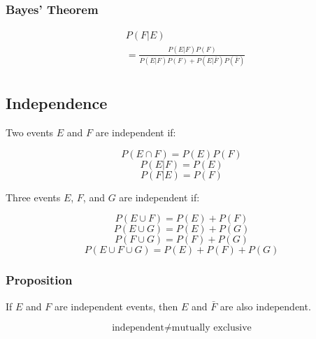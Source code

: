\subsubsection*{Bayes' Theorem}

\begin{align*}
       & P(F|E)                                                   \\
       & = \frac{P(E|F)P(F)}{P(E|F)P(F) + P(E|\bar{F})P(\bar{F})} \\
\end{align*}

\subsection*{Independence}

Two events $E$ and $F$ are independent if:

$$ P(E \cap F) = P(E)P(F) $$
$$ P(E|F) = P(E) $$
$$ P(F|E) = P(F) $$

Three events $E$, $F$, and $G$ are independent if:

$$ P(E \cup F) = P(E) + P(F) $$
$$ P(E \cup G) = P(E) + P(G) $$
$$ P(F \cup G) = P(F) + P(G) $$
$$ P(E \cup F \cup G) = P(E) + P(F) + P(G) $$

\subsubsection*{Proposition}

If $E$ and $F$ are independent events, then $E$ and $\bar{F}$ are also independent.

$$ \text{independent} \neq \text{mutually exclusive} $$